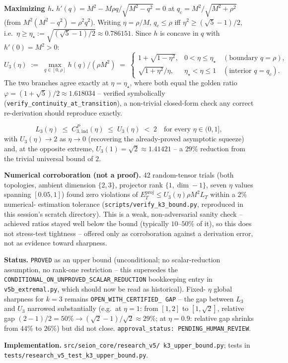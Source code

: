 \textbf{Maximizing $h$.} $h'(q)=M^2-M\rho q/\sqrt{M^2-q^2}=0$ at
$q_c=M^2/\sqrt{M^2+\rho^2}$ (from $M^2(M^2-q^2)=\rho^2q^2$). Writing
$\eta=\rho/M$, $q_c\le\rho$ iff $\eta^2\ge(\sqrt5-1)/2$, i.e.\
$\eta\ge\eta_\star:=\sqrt{(\sqrt5-1)/2}\approx0.786151$. Since $h$ is
concave in $q$ with $h'(0)=M^2>0$:
\[
  U_3(\eta) \;:=\; \max_{q\in[0,\rho]} h(q)\big/(\rho M^2) \;=\;
  \begin{cases}
    1+\sqrt{1-\eta^2}, & 0<\eta\le\eta_\star \quad(\text{boundary } q=\rho),\\[2pt]
    \sqrt{1+\eta^2}/\eta, & \eta_\star<\eta\le1 \quad(\text{interior } q=q_c).
  \end{cases}
\]
The two branches agree exactly at $\eta=\eta_\star$, where both equal the
golden ratio $\varphi=(1+\sqrt5)/2\approx1.618034$ -- verified symbolically
(\texttt{verify\_continuity\_at\_transition}), a non-trivial closed-form
check any correct re-derivation should reproduce exactly.

\[
  \boxed{\;L_3(\eta) \;\le\; C_{3,\mathrm{ind}}^{P}(\eta) \;\le\; U_3(\eta) \;<\; 2 \quad \text{for every } \eta\in(0,1],\;}
\]
with $U_3(\eta)\to2$ as $\eta\to0$ (recovering the already-proved
asymptotic squeeze) and, at the opposite extreme, $U_3(1)=\sqrt2\approx
1.41421$ -- a $29\%$ reduction from the trivial universal bound of $2$.

\textbf{Numerical corroboration (not a proof).} 42 random-tensor trials
(both topologies, ambient dimension $\{2,3\}$, projector rank $\{1,\dim-1\}$,
seven $\eta$ values spanning $[0.05,1]$) found zero violations of
$E_T^{\mathrm{proj}}\le U_3(\eta)\rho M^2L_T$ within a $2\%$ numerical-
estimation tolerance (\texttt{scripts/verify\_k3\_bound.py}, reproduced in
this session's scratch directory). This is a weak, non-adversarial sanity
check -- achieved ratios stayed well below the bound (typically $10$--$50\%$
of it), so this does not stress-test tightness -- offered only as
corroboration against a derivation error, not as evidence toward
sharpness.

\textbf{Status.} \texttt{PROVED} as an upper bound (unconditional; no
scalar-reduction assumption, no rank-one restriction -- this supersedes the
\texttt{CONDITIONAL\_ON\_UNPROVED\_SCALAR\_REDUCTION} bookkeeping entry in
\texttt{v5b\_extremal.py}, which should now be read as historical). Fixed-
$\eta$ global sharpness for $k=3$ remains \texttt{OPEN\_WITH\_CERTIFIED\_
GAP} -- the gap between $L_3$ and $U_3$ narrowed substantially (e.g.\ at
$\eta=1$: from $[1,2]$ to $[1,\sqrt2]$, relative gap $(2-1)/2=50\%\to
(\sqrt2-1)/\sqrt2\approx29\%$; at $\eta=0.9$: relative gap shrinks from
$44\%$ to $26\%$) but did not close. \texttt{approval\_status:
PENDING\_HUMAN\_REVIEW}.

\textbf{Implementation.} \texttt{src/seion\_core/research\_v5/
k3\_upper\_bound.py}; tests in
\texttt{tests/research\_v5\_test\_k3\_upper\_bound.py}.
